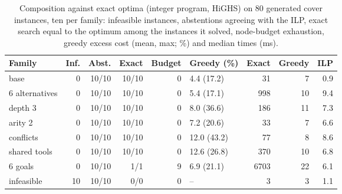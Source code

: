 \begin{table}[t]
\centering
\caption{Composition against exact optima (integer program, HiGHS) on 80 generated cover instances, ten per
family: infeasible instances, abstentions agreeing with the ILP, exact search equal to the optimum among the
instances it solved, node-budget exhaustion, greedy excess cost (mean, max; \%) and median times (ms).}
\label{tab:ev-opt}
\scriptsize
\setlength{\tabcolsep}{2.2pt}
\begin{tabular}{@{}lrrrrlrrr@{}}
\toprule
Family & Inf. & Abst. & Exact & Budget & Greedy (\%) & Exact & Greedy & ILP \\
\midrule
base & 0 & 10/10 & 10/10 & 0 & 4.4 (17.2) & 31 & 7 & 0.9 \\
6 alternatives & 0 & 10/10 & 10/10 & 0 & 5.4 (17.1) & 998 & 10 & 9.4 \\
depth 3 & 0 & 10/10 & 10/10 & 0 & 8.0 (36.6) & 186 & 11 & 7.3 \\
arity 2 & 0 & 10/10 & 10/10 & 0 & 7.2 (20.6) & 33 & 7 & 6.6 \\
conflicts & 0 & 10/10 & 10/10 & 0 & 12.0 (43.2) & 77 & 8 & 8.6 \\
shared tools & 0 & 10/10 & 10/10 & 0 & 12.6 (26.8) & 370 & 10 & 6.8 \\
6 goals & 0 & 10/10 & 1/1 & 9 & 6.9 (21.1) & 6703 & 22 & 6.1 \\
infeasible & 10 & 10/10 & 0/0 & 0 & -- & 3 & 3 & 1.1 \\
\bottomrule
\end{tabular}
\end{table}
